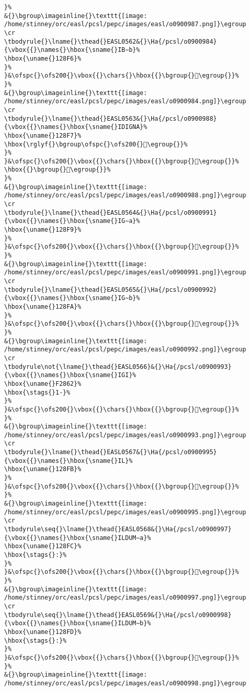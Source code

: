 \begin{verbatim}
}%
&{}\bgroup\imageinline{}\texttt{[image: /home/stinney/orc/easl/pcsl/pepc/images/easl/o0900987.png]}\egroup
\cr
\tbodyrule{}\lname{}\thead{}EASL0562&{}\Ha{/pcsl/o0900984}{\vbox{{}\names{}\hbox{\sname{}IB∼b}%
\hbox{\uname{}128F6}%
}%
}&\ofspc{}\ofs200{}\vbox{{}\chars{}\hbox{{}\bgroup{}𒣶\egroup{}}%
}%
&{}\bgroup\imageinline{}\texttt{[image: /home/stinney/orc/easl/pcsl/pepc/images/easl/o0900984.png]}\egroup
\cr
\tbodyrule{}\lname{}\thead{}EASL0563&{}\Ha{/pcsl/o0900988}{\vbox{{}\names{}\hbox{\sname{}IDIGNA}%
\hbox{\uname{}128F7}%
\hbox{\rglyf{}\bgroup\ofspc{}\ofs200{}𒣷\egroup{}}%
}%
}&\ofspc{}\ofs200{}\vbox{{}\chars{}\hbox{{}\bgroup{}𒣸\egroup{}}%
\hbox{{}\bgroup{}𒣷\egroup{}}%
}%
&{}\bgroup\imageinline{}\texttt{[image: /home/stinney/orc/easl/pcsl/pepc/images/easl/o0900988.png]}\egroup
\cr
\tbodyrule{}\lname{}\thead{}EASL0564&{}\Ha{/pcsl/o0900991}{\vbox{{}\names{}\hbox{\sname{}IG∼a}%
\hbox{\uname{}128F9}%
}%
}&\ofspc{}\ofs200{}\vbox{{}\chars{}\hbox{{}\bgroup{}𒣹\egroup{}}%
}%
&{}\bgroup\imageinline{}\texttt{[image: /home/stinney/orc/easl/pcsl/pepc/images/easl/o0900991.png]}\egroup
\cr
\tbodyrule{}\lname{}\thead{}EASL0565&{}\Ha{/pcsl/o0900992}{\vbox{{}\names{}\hbox{\sname{}IG∼b}%
\hbox{\uname{}128FA}%
}%
}&\ofspc{}\ofs200{}\vbox{{}\chars{}\hbox{{}\bgroup{}𒣺\egroup{}}%
}%
&{}\bgroup\imageinline{}\texttt{[image: /home/stinney/orc/easl/pcsl/pepc/images/easl/o0900992.png]}\egroup
\cr
\tbodyrule\not{\lname{}\thead{}EASL0566}&{}\Ha{/pcsl/o0900993}{\vbox{{}\names{}\hbox{\sname{}IGI}%
\hbox{\uname{}F2862}%
\hbox{\stags{}1-}%
}%
}&\ofspc{}\ofs200{}\vbox{{}\chars{}\hbox{{}\bgroup{}󲡢\egroup{}}%
}%
&{}\bgroup\imageinline{}\texttt{[image: /home/stinney/orc/easl/pcsl/pepc/images/easl/o0900993.png]}\egroup
\cr
\tbodyrule{}\lname{}\thead{}EASL0567&{}\Ha{/pcsl/o0900995}{\vbox{{}\names{}\hbox{\sname{}IL}%
\hbox{\uname{}128FB}%
}%
}&\ofspc{}\ofs200{}\vbox{{}\chars{}\hbox{{}\bgroup{}𒣻\egroup{}}%
}%
&{}\bgroup\imageinline{}\texttt{[image: /home/stinney/orc/easl/pcsl/pepc/images/easl/o0900995.png]}\egroup
\cr
\tbodyrule\seq{}\lname{}\thead{}EASL0568&{}\Ha{/pcsl/o0900997}{\vbox{{}\names{}\hbox{\sname{}ILDUM∼a}%
\hbox{\uname{}128FC}%
\hbox{\stags{}:}%
}%
}&\ofspc{}\ofs200{}\vbox{{}\chars{}\hbox{{}\bgroup{}𒣼\egroup{}}%
}%
&{}\bgroup\imageinline{}\texttt{[image: /home/stinney/orc/easl/pcsl/pepc/images/easl/o0900997.png]}\egroup
\cr
\tbodyrule\seq{}\lname{}\thead{}EASL0569&{}\Ha{/pcsl/o0900998}{\vbox{{}\names{}\hbox{\sname{}ILDUM∼b}%
\hbox{\uname{}128FD}%
\hbox{\stags{}:}%
}%
}&\ofspc{}\ofs200{}\vbox{{}\chars{}\hbox{{}\bgroup{}𒣽\egroup{}}%
}%
&{}\bgroup\imageinline{}\texttt{[image: /home/stinney/orc/easl/pcsl/pepc/images/easl/o0900998.png]}\egroup

\end{verbatim}

